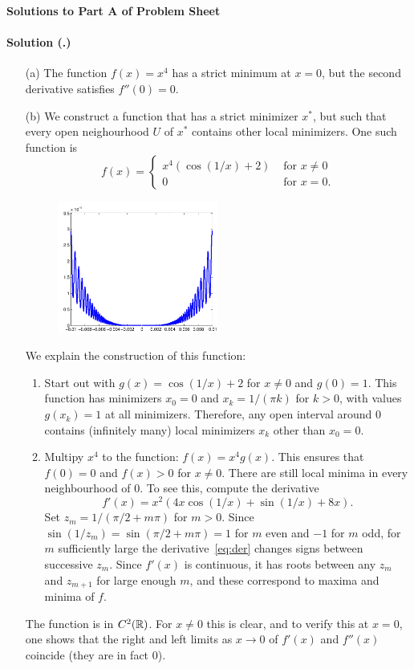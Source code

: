 \documentclass{article}
\newcounter{problemSheetNumber}
\newcounter{problems}
\renewcommand{\solution}[1]{\paragraph{Solution (\theproblemSheetNumber.\theproblems)}\addtocounter{problems}{1}\label{#1}}
\begin{document}
 
\begin{center}
{\Large {\bf Solutions to Part A of Problem Sheet \theproblemSheetNumber}}
\end{center}

\solution{pr:1}
\begin{itemize}
 \item[(a)] The function $f(x)=x^4$ has a strict minimum at $x=0$, but the second derivative satisfies $f''(0)=0$. 
 \item[(b)] We construct a function that has a strict minimizer $x^*$, but such that every open neighourhood $U$ of $x^*$ contains other local minimizers. One such function is
 \begin{equation*}
  f(x) = \begin{cases} x^4 (\cos(1/x)+2) & \text{ for } x\neq 0\\
          0 & \text{ for } x=0.
         \end{cases}
 \end{equation*}

\begin{figure}[h!]
\centering
 \includegraphics[width=0.5\textwidth]{images/strictmin_cropped.pdf}
\end{figure}
We explain the construction of this function:
\begin{enumerate}
 \item Start out with $g(x) = \cos(1/x)+2$ for $x\neq 0$ and $g(0)=1$. This function has minimizers $x_0=0$ and $x_k = 1/(\pi k)$ for $k>0$, with values $g(x_k)=1$ at all minimizers. Therefore, any open interval around $0$ contains (infinitely many) local minimizers $x_k$ other than $x_0=0$. 
 \item Multipy $x^4$ to the function: $f(x) = x^4g(x)$. This ensures that $f(0)=0$ and $f(x)>0$ for $x\neq 0$. There are still local minima in every neighbourhood of $0$. To see this, compute the derivative
 \begin{equation}\label{eq:der}\tag{1}
  f'(x) = x^2(4x\cos(1/x)+\sin(1/x)+8x).
 \end{equation}
 Set $z_m=1/(\pi/2+m\pi)$ for $m>0$. Since $\sin(1/z_m)=\sin(\pi/2+m\pi)= 1$ for $m$ even and $-1$ for $m$ odd, for $m$ sufficiently large the derivative~\eqref{eq:der} changes signs between successive $z_m$. Since $f'(x)$ is continuous, it has roots between any $z_m$ and $z_{m+1}$ for large enough $m$, and these correspond to maxima and minima of $f$.
\end{enumerate}
The function is in $C^2(\mathbb{R})$. For $x\neq 0$ this is clear, and to verify this at $x=0$, one shows that the right and left limits as $x\to 0$ of $f'(x)$ and $f''(x)$ coincide (they are in fact $0$).


\end{itemize}
\end{document}

